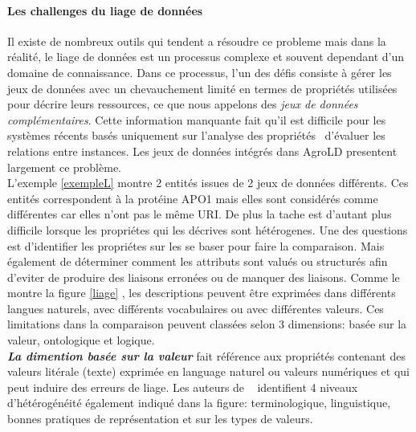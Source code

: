 \paragraph{Les challenges du liage de données}
Il existe de nombreux outils qui tendent a résoudre ce probleme mais dans la réalité, le liage de données est un processus complexe et souvent dependant d'un domaine de connaissance. Dans ce processus, l'un des défis consiste à gérer les jeux de données avec un chevauchement limité en termes de propriétés utilisées pour décrire leurs ressources, ce que nous appelons des \textit{jeux de données complémentaires}. Cette information manquante fait qu'il est difficile pour les systèmes récents basés uniquement sur l'analyse des propriétés~\cite{Jentzsch,Ngomo2011} d'évaluer les relations entre instances. Les jeux de données intégrés dans AgroLD presentent largement ce problème. \\

L’exemple \ref{exempleL} montre 2 entités issues de 2 jeux de données différents. Ces entités correspondent à la protéine APO1 mais elles sont considérés comme différentes car elles n’ont pas le même URI. De plus la tache est d'autant plus difficile lorsque les propriétes qui les décrives sont hétérogenes. Une des questions est d'identifier les propriétes sur les se baser pour faire la comparaison. Mais également de déterminer comment les attributs sont valués ou structurés afin d'eviter de produire des liaisons erronées ou de manquer des liaisons. Comme le montre la figure  \ref{liage} , les descriptions peuvent être exprimées dans différents langues naturels, avec différents vocabulaires ou avec différentes valeurs. Ces limitations dans la comparaison peuvent classées selon 3 dimensions: basée sur la valeur, ontologique et logique. \\


\textbf{\textit{La dimention basée sur la valeur}} fait référence aux propriétés contenant des valeurs litérale (texte) exprimée en language naturel ou valeurs numériques et qui peut induire des erreurs de liage. Les auteurs de  ~\cite{achichi2018} identifient 4 niveaux d'hétérogénéité également indiqué dans la figure: terminologique, linguistique, bonnes pratiques de représentation et sur les types de valeurs.\\

